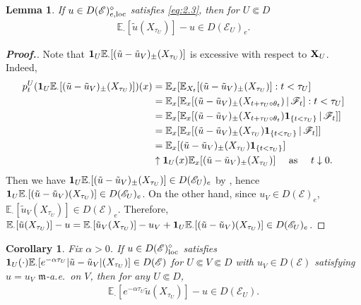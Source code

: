 \documentclass[12pt,a4paper]{article}
\newtheorem{cor}[thm]{Corollary}
\newtheorem{lem}[thm]{Lemma}
\newcommand{\m}{\mathfrak{m} }
\newcommand{\loc}{{\rm loc}}
\newcommand{\1}{{\bf 1}}
\begin{document}
\begin{lem}\label{lem:lattice2}
If $u\in  D(\mathscr{E})^{\diamond}_{e,\loc}$ satisfies \eqref{eq:2.3}, 
then for $U\Subset D$
\begin{align}
\mathbb{E}_{\cdot}[\tilde{u}(X_{\tau_U})]-u
\in D(\mathscr{E}_U)_e.\label{eq:2.3*}
\end{align}
\end{lem}
\begin{proof}[{\bf Proof.}]
Note that $\1_U\mathbb{E}_{\cdot}[(\tilde{u}-\tilde{u}_V)_{\pm}(X_{\tau_U})]$ is excessive with respect to ${\bf X}_U$. Indeed, 
\begin{align*}
p_t^U(\1_U\mathbb{E}_{\cdot}[(\tilde{u}-\tilde{u}_V)_{\pm}(X_{\tau_U})])(x)&=
\mathbb{E}_x[\mathbb{E}_{X_t}[(\tilde{u}-\tilde{u}_V)_{\pm}(X_{\tau_U})]:t<\tau_U]\\
&=\mathbb{E}_x[\mathbb{E}_x[
(\tilde{u}-\tilde{u}_V)_{\pm}(X_{t+\tau_U\circ \theta_t})
\,|\,\mathscr{F}_t]:t<\tau_U]\\
&=\mathbb{E}_x[\mathbb{E}_x[(\tilde{u}-\tilde{u}_V)_{\pm}(X_{t+\tau_U\circ \theta_t})\1_{\{t<\tau_U\}}\,|\,\mathscr{F}_t]]\\
&=\mathbb{E}_x[\mathbb{E}_x[(\tilde{u}-\tilde{u}_V)_{\pm}(X_{\tau_U})\1_{\{t<\tau_U\}}\,|\,\mathscr{F}_t]]\\
&=\mathbb{E}_x[(\tilde{u}-\tilde{u}_V)_{\pm}(X_{\tau_U})\1_{\{t<\tau_U\}}]
\\&\uparrow \1_U(x)\mathbb{E}_x[(\tilde{u}-\tilde{u}_V)_{\pm}(X_{\tau_U})]
\quad\text{ as }\quad t\downarrow 0.
\end{align*}
Then we have 
$\1_U\mathbb{E}_{\cdot}[(\tilde{u}-\tilde{u}_V)_{\pm}(X_{\tau_U})]\in D(\mathscr{E}_U)_e$ by \cite[Lemma~3.3]{CK}, hence $\1_U\mathbb{E}_{\cdot}[(\tilde{u}-\tilde{u}_V)(X_{\tau_U})]\in D(\mathscr{E}_U)_e$. On the other hand, since 
$u_V\in D(\mathscr{E})_e$,  
$\mathbb{E}_{\cdot}[\tilde{u}_V(X_{\tau_U})]
\in D(\mathscr{E})_e$. Therefore, 
$\mathbb{E}_{\cdot}[\tilde{u}(X_{\tau_U})]-u=
\mathbb{E}_{\cdot}[\tilde{u}_V(X_{\tau_U})]-u_V
+\1_U \mathbb{E}_{\cdot}[(\tilde{u}-\tilde{u}_V)(X_{\tau_U})]\in D(\mathscr{E}_U)_e$. 
\end{proof}
\begin{cor}\label{cor:lattice2}
Fix $\alpha>0$. 
If $u\in  D(\mathscr{E})^{\diamond}_{\loc}$ satisfies 
$\1_U(\cdot)\mathbb{E}_{\cdot}[e^{-\alpha\tau_U}|\tilde{u}-\tilde{u}_V|(X_{\tau_U})]\in D(\mathscr{E})$ for $U\Subset V\Subset D$ with $u_V\in D(\mathscr{E})$ satisfying $u=u_V$ ${\m}$-a.e.~on $V$, then for any $U\Subset D$,
\begin{align}
\mathbb{E}_{\cdot}[e^{-\alpha\tau_U}\tilde{u}(X_{\tau_U})]-u
\in D(\mathscr{E}_U).\label{eq:2.3**}
\end{align}
\end{cor}
\end{document}
